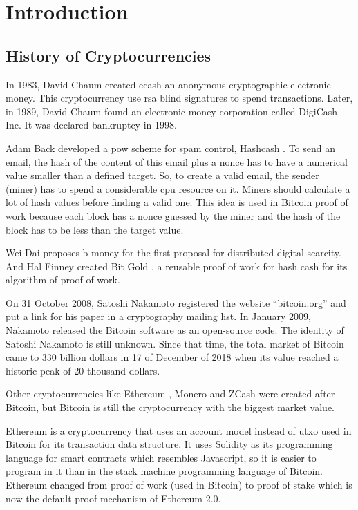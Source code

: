 \section{Introduction}

\subsection{History of Cryptocurrencies} 

In 1983, David Chaum created ecash \cite{panurach1996money} an anonymous cryptographic electronic money.
This cryptocurrency use \gls{rsa} blind signatures \cite{chaum1983blind} to spend transactions.
Later, in 1989, David Chaum found an electronic money corporation called DigiCash Inc.
It was declared bankruptcy in 1998.

Adam Back developed a \gls{pow} scheme for spam control, Hashcash \cite{back2002hashcash}.
To send an email, the hash of the content of this email plus a nonce has to have a numerical value
smaller than a defined target.
So, to create a valid email, the sender (miner) has to spend a considerable \gls{cpu} resource on it.
Miners should calculate a lot of hash values before finding a valid one.
This idea is used in Bitcoin proof of work because each block has a nonce guessed by the miner and
the hash of the block has to be less than the target value.

Wei Dai proposes b-money \cite{dai1998b} for the first proposal for distributed digital scarcity.
And Hal Finney created Bit Gold \cite{wallace2011rise}, a reusable proof of work for hash cash for
its algorithm of proof of work.

On 31 October 2008, Satoshi Nakamoto registered the website ``bitcoin.org'' and put a link for his
paper \cite{nakamoto2008bitcoin} in a cryptography mailing list.
In January 2009, Nakamoto released the Bitcoin software as an open-source code.
The identity of Satoshi Nakamoto is still unknown.
Since that time, the total market of Bitcoin came to 330 billion dollars in 17 of December of 2018
when its value reached a historic peak of 20 thousand dollars.

Other cryptocurrencies like Ethereum \cite{wood2014ethereum}, Monero \cite{noether2015ring} and
ZCash \cite{hopwood2016zcash} were created after Bitcoin,
but Bitcoin is still the cryptocurrency with the biggest market value.

Ethereum is a cryptocurrency that uses an account model instead of \gls{utxo} used in Bitcoin for its
transaction data structure.
It uses Solidity as its programming language for smart contracts which resembles Javascript,
so it is easier to program in it than in the stack machine programming language of Bitcoin.
Ethereum changed from proof of work (used in Bitcoin) to proof of stake
which is now the default proof mechanism of Ethereum 2.0.

